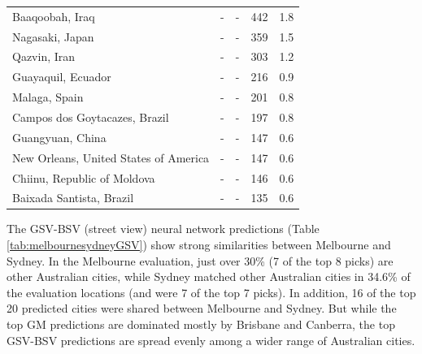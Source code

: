 \documentclass[Crown,sageh,times]{sagej}
\begin{document}
\begin{table}[!htbp]
\begin{tabular}{ l  l l l  l}
Baaqoobah, Iraq &-&- & 442 & 1.8\\ 
Nagasaki, Japan &-&- & 359 & 1.5\\ 
Qazvin, Iran &-&- & 303 & 1.2\\ 
Guayaquil, Ecuador &-&- & 216 & 0.9\\ 
Malaga, Spain &-&- & 201 & 0.8\\ 
Campos dos Goytacazes, Brazil &-&- & 197 & 0.8\\ 
Guangyuan, China &-&- & 147 & 0.6\\ 
New Orleans, United States of America &-&- & 147 & 0.6\\ 
Chiinu, Republic of Moldova &-&- & 146 & 0.6\\ 
Baixada Santista, Brazil &-&- & 135 & 0.6\\ \hline
\end{tabular}
\end{table}


The GSV-BSV (street view) neural network predictions (Table \ref{tab:melbournesydneyGSV}) show strong similarities between Melbourne and Sydney. In the Melbourne evaluation, just over 30\% (7 of the top 8 picks) are other Australian cities, while Sydney matched other Australian cities in 34.6\% of the evaluation locations (and were 7 of the top 7 picks). In addition, 16 of the top 20 predicted cities were shared between Melbourne and Sydney. But while the top GM predictions are dominated mostly by Brisbane and Canberra, the top GSV-BSV predictions are spread evenly among a wider range of Australian cities.
\end{document}
